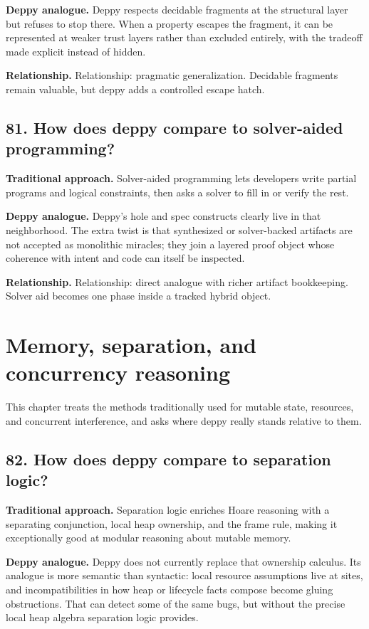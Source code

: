 \documentclass[11pt,openany]{book}
\begin{document}
\textbf{Deppy analogue.} Deppy respects decidable fragments at the structural layer but refuses to stop there. When a property escapes the fragment, it can be represented at weaker trust layers rather than excluded entirely, with the tradeoff made explicit instead of hidden.

\textbf{Relationship.} Relationship: pragmatic generalization. Decidable fragments remain valuable, but deppy adds a controlled escape hatch.

\section*{81. How does deppy compare to solver-aided programming?}
\textbf{Traditional approach.} Solver-aided programming lets developers write partial programs and logical constraints, then asks a solver to fill in or verify the rest.

\textbf{Deppy analogue.} Deppy's hole and spec constructs clearly live in that neighborhood. The extra twist is that synthesized or solver-backed artifacts are not accepted as monolithic miracles; they join a layered proof object whose coherence with intent and code can itself be inspected.

\textbf{Relationship.} Relationship: direct analogue with richer artifact bookkeeping. Solver aid becomes one phase inside a tracked hybrid object.

\chapter{Memory, separation, and concurrency reasoning}
This chapter treats the methods traditionally used for mutable state, resources, and concurrent interference, and asks where deppy really stands relative to them.

\section*{82. How does deppy compare to separation logic?}
\textbf{Traditional approach.} Separation logic enriches Hoare reasoning with a separating conjunction, local heap ownership, and the frame rule, making it exceptionally good at modular reasoning about mutable memory.

\textbf{Deppy analogue.} Deppy does not currently replace that ownership calculus. Its analogue is more semantic than syntactic: local resource assumptions live at sites, and incompatibilities in how heap or lifecycle facts compose become gluing obstructions. That can detect some of the same bugs, but without the precise local heap algebra separation logic provides.
\end{document}
